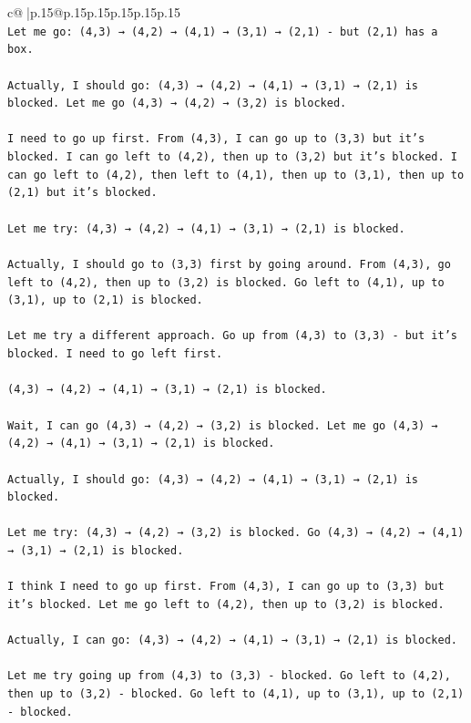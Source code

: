 \documentclass{article}
\begin{document}
{\begin{supertabular}{c@{$\;$}|p{.15\linewidth}@{}p{.15\linewidth}p{.15\linewidth}p{.15\linewidth}p{.15\linewidth}p{.15\linewidth}}
{{{\\ 
\texttt{Let me go: (4,3) → (4,2) → (4,1) → (3,1) → (2,1) {-} but (2,1) has a box.} \\
\\ 
\texttt{Actually, I should go: (4,3) → (4,2) → (4,1) → (3,1) → (2,1) is blocked. Let me go (4,3) → (4,2) → (3,2) is blocked. } \\
\\ 
\texttt{I need to go up first. From (4,3), I can go up to (3,3) but it's blocked. I can go left to (4,2), then up to (3,2) but it's blocked. I can go left to (4,2), then left to (4,1), then up to (3,1), then up to (2,1) but it's blocked.} \\
\\ 
\texttt{Let me try: (4,3) → (4,2) → (4,1) → (3,1) → (2,1) is blocked. } \\
\\ 
\texttt{Actually, I should go to (3,3) first by going around. From (4,3), go left to (4,2), then up to (3,2) is blocked. Go left to (4,1), up to (3,1), up to (2,1) is blocked.} \\
\\ 
\texttt{Let me try a different approach. Go up from (4,3) to (3,3) {-} but it's blocked. I need to go left first.} \\
\\ 
\texttt{(4,3) → (4,2) → (4,1) → (3,1) → (2,1) is blocked. } \\
\\ 
\texttt{Wait, I can go (4,3) → (4,2) → (3,2) is blocked. Let me go (4,3) → (4,2) → (4,1) → (3,1) → (2,1) is blocked.} \\
\\ 
\texttt{Actually, I should go: (4,3) → (4,2) → (4,1) → (3,1) → (2,1) is blocked. } \\
\\ 
\texttt{Let me try: (4,3) → (4,2) → (3,2) is blocked. Go (4,3) → (4,2) → (4,1) → (3,1) → (2,1) is blocked.} \\
\\ 
\texttt{I think I need to go up first. From (4,3), I can go up to (3,3) but it's blocked. Let me go left to (4,2), then up to (3,2) is blocked. } \\
\\ 
\texttt{Actually, I can go: (4,3) → (4,2) → (4,1) → (3,1) → (2,1) is blocked. } \\
\\ 
\texttt{Let me try going up from (4,3) to (3,3) {-} blocked. Go left to (4,2), then up to (3,2) {-} blocked. Go left to (4,1), up to (3,1), up to (2,1) {-} blocked.} \\
}}}
\end{supertabular}}
\end{document}

